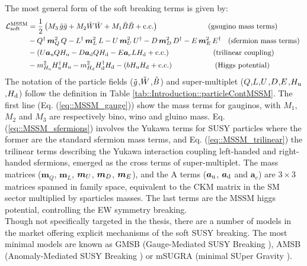 The most general form of the soft breaking terms is given by:
%
\begin{align}
\mathcal{L}^{\mathrm{MSSM}}_{\mathrm{soft}} 
& = \frac{1}{2} \left( M_3 \, \tg\tg + M_2 \tW\tW + M_1 \tB\tB + \mathrm{c.c.}  \right)  \mbox{\phantom{MMMMMMM} (gaugino mass terms)}  \label{eq::MSSM_gauge} \\
%
& - Q^{\dg} \, \bm{m}_{Q}^2    \, Q 
  - L^{\dg} \, \bm{m}_{L}^2    \, L 
  - \spu    \, \bm{m}_{\spu}^2 \, \spu^{\dg} 
  - \spd    \, \bm{m}_{\spd}^2 \, \spd^{\dg} 
  - \spe    \, \bm{m}_{\spe}^2 \, \spe^{\dg}  \mbox{\phantom{M}(sfermion mass terms)  }  \label{eq::MSSM_sfermions} \\
%
& -  \left( 
  \spu \bm{a}_\mup Q H_\mup 
- \spd \bm{a}_\mdn Q H_\mdn 
- \spe \bm{a}_e    L H_\mdn 
+ \mathrm{c.c.}  \right)  \mbox{\phantom{MMMMMM} (trilinear coupling)} \label{eq::MSSM_trilinear} \\
%
& - m^2_{H_\mup} H_{\mup}^{\dg} H_\mup  
  - m^2_{H_\mdn} H_{\mdn}^{\dg} H_\mdn  
  - (b H_\mup H_\mdn + \mathrm{c.c.})   \mbox{\phantom{MMMMMM} (Higgs potential)} \label{eq::MSSM_higgs}
%
\end{align}
The notation of the particle fields ($\tilde{g}$,$\tilde{W}$,$\tilde{B}$) and super-multiplet ($Q$,$L$,$U$,$D$,$E$,$H_{\mathrm{u}}$,$H_{\mathrm{d}}$) follow the definition in Table \ref{tab::Introduction::particleContMSSM}.
The first line (Eq. (\ref{eq::MSSM_gauge})) show the mass terms for gauginos, with $M_1$, $M_2$ and $M_3$ are respectively bino, wino and gluino mass. Eq. (\ref{eq::MSSM_sfermions}) involves the Yukawa terms for SUSY particles where the former are the standard sfermion mass terms, and Eq. (\ref{eq::MSSM_trilinear}) the trilinear terms describing the Yukawa interaction coupling left-handed and right-handed sfermions, emerged as the cross terms of super-multiplet. The mass matrices ($\bm{m}_Q$, $\bm{m}_L$, $\bm{m}_{U}$, $\bm{m}_{D}$, $\bm{m}_{E}$), and the A terms ($\bm{a}_{\mathrm{u}}$, $\bm{a}_{\mathrm{d}}$ and $\bm{a}_e$) are $3\times3$ matrices spanned in family space, equivalent to the CKM matrix in the SM sector multiplied by sparticles masses. The last terms \label{eq::MSSM_higgs} are the MSSM higgs potential, controlling the EW symmetry breaking.  \\

Though not specifically targeted in the thesis, there are a number of models in the market offering explicit mechanisms of the soft SUSY breaking. The most minimal models are known as GMSB (Gauge-Mediated SUSY Breaking \cite{GMSB}), AMSB (Anomaly-Mediated SUSY Breaking \cite{AMSB1,AMSB2}) or mSUGRA (minimal SUper Gravity \cite{SUGRA}). \\


